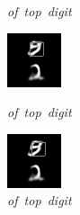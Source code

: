 \documentclass{article} %
\begin{document}
\begin{figure}[t]
  \caption{\mbox{\textit{of top digit}}}
\endminipage\hfill
{}
  \includegraphics[width=\linewidth]{figures/9-2-26.png}
  \caption{\mbox{\textit{of top digit}}}
\endminipage\hfill
{}
  \includegraphics[width=\linewidth]{figures/9-2-27.png}
  \caption{\mbox{\textit{of top digit}}}
\endminipage\hfill


\end{figure}
\end{document}
